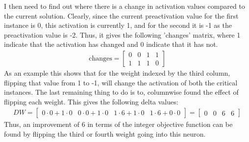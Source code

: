 I then need to find out where there is a change in activation values compared to the current solution. Clearly, since the current preactivation value for the first instance is 0, this activation is currently 1, and for the second it is -1 as the preactivation value is -2. Thus, it gives the following 'changes' matrix, where 1 indicate that the activation has changed and 0 indicate that it has not. 
\begin{align*}
    \text{changes} = 
    \begin{bmatrix}
        0 & 0 & 1 & 1 \\
        1 & 1 & 1 & 0
    \end{bmatrix}
\end{align*}
As an example this shows that for the weight indexed by the third column, flipping that value from 1 to -1, will change the activation of both the critical instances. The last remaining thing to do is to, columnwise found the effect of flipping each weight. This gives the following delta values:
\begin{align*}
    DW = 
    \begin{bmatrix}
        0 \cdot 0 + 1 \cdot 0 & 0 \cdot 0 + 1 \cdot 0 & 1 \cdot 6 + 1 \cdot 0 & 1 \cdot 6 + 0 \cdot 0
    \end{bmatrix}
    = 
    \begin{bmatrix}
        0 & 0 & 6 & 6
    \end{bmatrix}
\end{align*}
Thus, an improvement of 6 in terms of the integer objective function can be found by flipping the third or fourth weight going into this neuron. 



